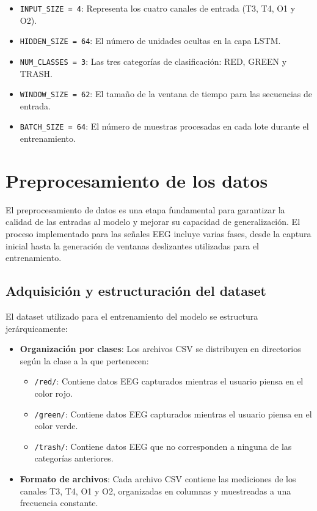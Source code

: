 \begin{itemize}
    \item \texttt{INPUT\_SIZE = 4}: Representa los cuatro canales de entrada (T3, T4, O1 y O2).
    \item \texttt{HIDDEN\_SIZE = 64}: El número de unidades ocultas en la capa LSTM.
    \item \texttt{NUM\_CLASSES = 3}: Las tres categorías de clasificación: RED, GREEN y TRASH.
    \item \texttt{WINDOW\_SIZE = 62}: El tamaño de la ventana de tiempo para las secuencias de entrada.
    \item \texttt{BATCH\_SIZE = 64}: El número de muestras procesadas en cada lote durante el entrenamiento.
\end{itemize}

\section{Preprocesamiento de los datos}

El preprocesamiento de datos es una etapa fundamental para garantizar la calidad de las entradas al modelo y mejorar su capacidad de generalización. El proceso implementado para las señales EEG incluye varias fases, desde la captura inicial hasta la generación de ventanas deslizantes utilizadas para el entrenamiento.

\subsection{Adquisición y estructuración del dataset}

El dataset utilizado para el entrenamiento del modelo se estructura jerárquicamente:

\begin{itemize}
    \item \textbf{Organización por clases}: Los archivos CSV se distribuyen en directorios según la clase a la que pertenecen:
    \begin{itemize}
        \item \texttt{/red/}: Contiene datos EEG capturados mientras el usuario piensa en el color rojo.
        \item \texttt{/green/}: Contiene datos EEG capturados mientras el usuario piensa en el color verde.
        \item \texttt{/trash/}: Contiene datos EEG que no corresponden a ninguna de las categorías anteriores.
    \end{itemize}
    
    \item \textbf{Formato de archivos}: Cada archivo CSV contiene las mediciones de los canales T3, T4, O1 y O2, organizadas en columnas y muestreadas a una frecuencia constante.
\end{itemize}

